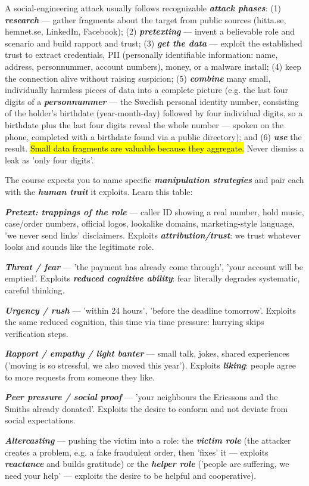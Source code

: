 \documentclass[12pt, a4paper]{article}
\newcommand{\term}[1]{\textbf{\textit{#1}}}        %
\newcommand{\imp}[1]{\hl{#1}}                       %
\begin{document}
A social-engineering attack usually follows recognizable \term{attack phases}: (1) \term{research} --- gather fragments about the target from public sources (hitta.se, hemnet.se, LinkedIn, Facebook); (2) \term{pretexting} --- invent a believable role and scenario and build rapport and trust; (3) \term{get the data} --- exploit the established trust to extract credentials, PII (personally identifiable information: name, address, personnummer, account numbers), money, or a malware install; (4) keep the connection alive without raising suspicion; (5) \term{combine} many small, individually harmless pieces of data into a complete picture (e.g. the last four digits of a \term{personnummer} --- the Swedish personal identity number, consisting of the holder's birthdate (year-month-day) followed by four individual digits, so a birthdate plus the last four digits reveal the whole number --- spoken on the phone, completed with a birthdate found via a public directory); and (6) \term{use} the result. \imp{Small data fragments are valuable because they aggregate.} Never dismiss a leak as 'only four digits'.

The course expects you to name specific \term{manipulation strategies} and pair each with the \term{human trait} it exploits. Learn this table:
\begin{tightitem}
\item \term{Pretext: trappings of the role} --- caller ID showing a real number, hold music, case/order numbers, official logos, lookalike domains, marketing-style language, 'we never send links' disclaimers. Exploits \term{attribution/trust}: we trust whatever looks and sounds like the legitimate role.
\item \term{Threat / fear} --- 'the payment has already come through', 'your account will be emptied'. Exploits \term{reduced cognitive ability}: fear literally degrades systematic, careful thinking.
\item \term{Urgency / rush} --- 'within 24 hours', 'before the deadline tomorrow'. Exploits the same reduced cognition, this time via time pressure: hurrying skips verification steps.
\item \term{Rapport / empathy / light banter} --- small talk, jokes, shared experiences ('moving is so stressful, we also moved this year'). Exploits \term{liking}: people agree to more requests from someone they like.
\item \term{Peer pressure / social proof} --- 'your neighbours the Ericssons and the Smiths already donated'. Exploits the desire to conform and not deviate from social expectations.
\item \term{Altercasting} --- pushing the victim into a role: the \term{victim role} (the attacker creates a problem, e.g. a fake fraudulent order, then 'fixes' it --- exploits \term{reactance} and builds gratitude) or the \term{helper role} ('people are suffering, we need your help' --- exploits the desire to be helpful and cooperative).
\end{tightitem}
\end{document}

